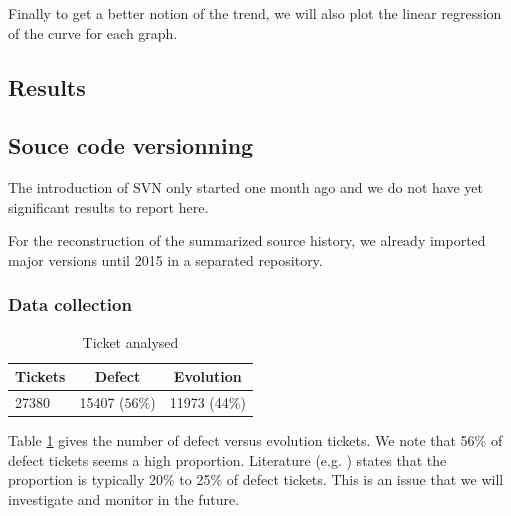 \documentclass[10pt,conference]{IEEEtran}
\begin{document}
Finally to get a better notion of the trend, we will also plot the linear regression of the curve for each graph.

\subsection{Results}

\subsection{Souce code versionning}

The introduction of SVN only started one month ago and we do not have yet significant results to report here.

For the reconstruction of the summarized source history, we already imported major versions until 2015 in a separated repository. 

\subsubsection{Data collection}

\begin{table}[htbp]
  \begin{center}
    \caption{Ticket analysed}
    \label{tab:proportion}
    \begin{tabular}{| l | c |c|}
      \hline
      Tickets & Defect  & Evolution  \\
      \hline
      27380&15407 ($56\%$)&11973 (44\%)\\
      \hline 
    \end{tabular}
  \end{center}  
\end{table}

Table \ref{tab:proportion} gives the number of defect versus evolution tickets.
We note that 56\% of defect tickets seems a high proportion.
Literature (e.g. \cite{Pigo96a}) states that the proportion is typically 20\% to 25\% of defect tickets.
This is an issue that we will investigate and monitor in the future.
\end{document}
